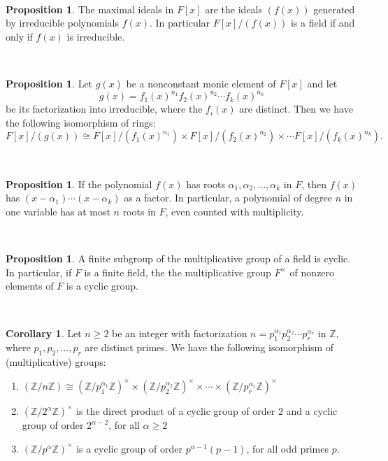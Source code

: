 \documentclass{article}
\theoremstyle{definition}
\newtheorem{prop}[thm]{Proposition}
\newtheorem{cor}[thm]{Corollary}
\newcommand{\nl}{\vspace{4cm}\\}
\newcommand{\Z}{\mathbb{Z}}
\newcommand{\al}{\alpha}
\begin{document}
\nl

\begin{prop}
The maximal ideals in $F[x]$ are the ideals $(f(x))$ generated by irreducible polynomials $f(x)$. In particular $F[x]/ (f(x))$ is a field if and only if $f(x)$ is irreducible.
\end{prop}

\nl

\begin{prop}
Let $g(x)$ be a nonconstant monic element of $F[x]$ and let
\[g(x) = f_1(x)^{n_1}f_2(x)^{n_2}\cdots f_k(x)^{n_k}\]
be its factorization into irreducible, where the $f_i(x)$ are distinct. Then we have the following isomorphism of rings:
\[F[x]/(g(x)) \cong F[x]/ (f_1(x)^{n_1}) \times F[x]/ (f_2(x)^{n_2}) \times \cdots F[x]/ (f_k(x)^{n_k}).\]
\end{prop}

\nl

\begin{prop}
If the polynomial $f(x)$ has roots $\al_1,\al_2,\ldots,\al_k$ in $F$, then $f(x)$ has $(x-\al_1)\cdots (x-\al_k)$ as a factor. In particular, a polynomial of degree $n$ in one variable has at most $n$ roots in $F$, even counted with multiplicity.
\end{prop}

\nl

\begin{prop}
A finite subgroup of the multiplicative group of a field is cyclic. In particular, if $F$ is a finite field, the the multiplicative group $F^\times$ of nonzero elements of $F$ is a cyclic group.
\end{prop}

\nl

\begin{cor}
Let $n\geq 2$ be an integer with factorization $n = p_1^{\al_1}p_2^{\al_2}\cdots p_r^{\al_r}$ in $\Z$, where $p_1,p_2,\ldots,p_r$ are distinct primes. We have the following isomorphism of (multiplicative) groups:
\begin{enumerate}
\item $(\Z/n\Z)\cong (\Z/p_1^{\al_1}\Z)^\times \times (\Z/p_2^{\al_2}\Z)^\times \times \cdots \times(\Z/p_r^{\al_r}\Z)^\times$
\item $(\Z/2^\al \Z)^\times$ is the direct product of a cyclic group of order 2 and a cyclic group of order $2^{\al -2}$, for all $\al \geq 2$
\item $(\Z/p^\al \Z)^\times$ is a cyclic group of order $p^{\al -1}(p-1)$, for all odd primes $p$.
\end{enumerate}
\end{cor}
\end{document}
